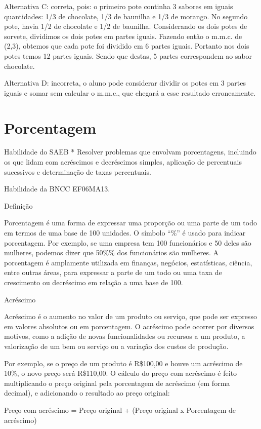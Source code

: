 Alternativa C: correta, pois: o primeiro pote continha 3 sabores em
iguais quantidades: 1/3 de chocolate, 1/3 de baunilha e 1/3 de morango.
No segundo pote, havia 1/2 de chocolate e 1/2 de baunilha. Considerando
os dois potes de sorvete, dividimos os dois potes em partes iguais.
Fazendo então o m.m.c. de (2,3), obtemos que cada pote foi dividido em 6
partes iguais. Portanto nos dois potes temos 12 partes iguais. Sendo que
destas, 5 partes correspondem ao sabor chocolate.

Alternativa D: incorreta, o aluno pode considerar dividir os potes em 3
partes iguais e somar sem calcular o m.m.c., que chegará a esse
resultado erroneamente.

\chapter{Porcentagem}

Habilidade do SAEB * Resolver problemas que envolvam porcentagens,
incluindo os que lidam com acréscimos e decréscimos simples, aplicação
de percentuais sucessivos e determinação de taxas percentuais.

Habilidade da BNCC EF06MA13.

Definição

Porcentagem é uma forma de expressar uma proporção ou uma parte de um
todo em termos de uma base de 100 unidades. O símbolo ``\%'' é usado
para indicar porcentagem. Por exemplo, se uma empresa tem 100
funcionários e 50 deles são mulheres, podemos dizer que 50\%\% dos
funcionários são mulheres. A porcentagem é amplamente utilizada em
finanças, negócios, estatísticas, ciência, entre outras áreas, para
expressar a parte de um todo ou uma taxa de crescimento ou decréscimo em
relação a uma base de 100.

Acréscimo

Acréscimo é o aumento no valor de um produto ou serviço, que pode ser
expresso em valores absolutos ou em porcentagem. O acréscimo pode
ocorrer por diversos motivos, como a adição de novas funcionalidades ou
recursos a um produto, a valorização de um bem ou serviço ou a variação
dos custos de produção.

Por exemplo, se o preço de um produto é R\$100,00 e houve um acréscimo
de 10\%, o novo preço será R\$110,00. O cálculo do preço com acréscimo é
feito multiplicando o preço original pela porcentagem de acréscimo (em
forma decimal), e adicionando o resultado ao preço original:

Preço com acréscimo = Preço original + (Preço original x Porcentagem de
acréscimo)

